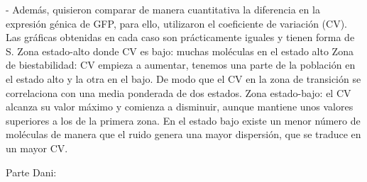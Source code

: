 - Además, quisieron comparar de manera cuantitativa la diferencia en la expresión génica de GFP, para ello, utilizaron el coeficiente de variación (CV). Las gráficas obtenidas en cada caso son prácticamente iguales y tienen forma de S. 
	Zona estado-alto donde CV es bajo: muchas moléculas en el estado alto 
	Zona de biestabilidad: CV empieza a aumentar, tenemos una parte de la población en el estado alto y la otra en el bajo. De modo que el CV en la zona de transición se correlaciona con una media ponderada de dos estados.
	Zona estado-bajo: el CV alcanza su valor máximo y comienza a disminuir, aunque mantiene unos valores superiores a los de la primera zona. En el estado bajo existe un menor número de moléculas de manera que el ruido genera una mayor dispersión, que se traduce en un mayor CV.


Parte Dani:

